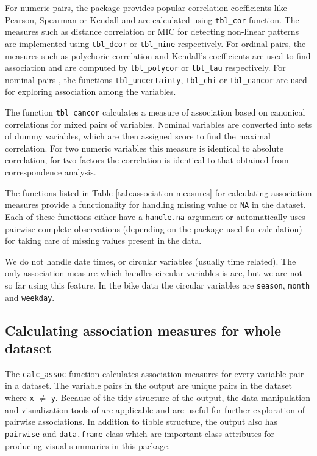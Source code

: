 For numeric pairs, the package provides popular correlation coefficients
like Pearson, Spearman or Kendall and are calculated using
\texttt{tbl\_cor} function. The measures such as distance correlation or
MIC for detecting non-linear patterns are implemented using
\texttt{tbl\_dcor} or \texttt{tbl\_mine} respectively. For ordinal
pairs, the measures such as polychoric correlation and Kendall's
coefficients are used to find association and are computed by
\texttt{tbl\_polycor} or \texttt{tbl\_tau} respectively. For nominal
pairs , the functions \texttt{tbl\_uncertainty}, \texttt{tbl\_chi} or
\texttt{tbl\_cancor} are used for exploring association among the
variables.

The function \texttt{tbl\_cancor} calculates a measure of association
based on canonical correlations for mixed pairs of variables. Nominal
variables are converted into sets of dummy variables, which are then
assigned score to find the maximal correlation. For two numeric
variables this measure is identical to absolute correlation, for two
factors the correlation is identical to that obtained from
correspondence analysis.

The functions listed in Table \ref{tab:association-measures} for
calculating association measures provide a functionality for handling
missing value or \texttt{NA} in the dataset. Each of these functions
either have a \texttt{handle.na} argument or automatically uses pairwise
complete observations (depending on the package used for calculation)
for taking care of missing values present in the data.

We do not handle date times, or circular variables (usually time
related). The only association measure which handles circular variables
is ace, but we are not so far using this feature. In the bike data the
circular variables are \texttt{season}, \texttt{month} and
\texttt{weekday}.

\hypertarget{calculating-association-measures-for-whole-dataset}{%
\subsection{Calculating association measures for whole
dataset}\label{calculating-association-measures-for-whole-dataset}}

The \texttt{calc\_assoc} function calculates association measures for
every variable pair in a dataset. The variable pairs in the output are
unique pairs in the dataset where \texttt{x} \(\neq\) \texttt{y}.
Because of the tidy structure of the output, the data manipulation and
visualization tools of  \citep{tidyverse} are
applicable and are useful for further exploration of pairwise
associations. In addition to tibble structure, the output also has
\texttt{pairwise} and \texttt{data.frame} class which are important
class attributes for producing visual summaries in this package.

